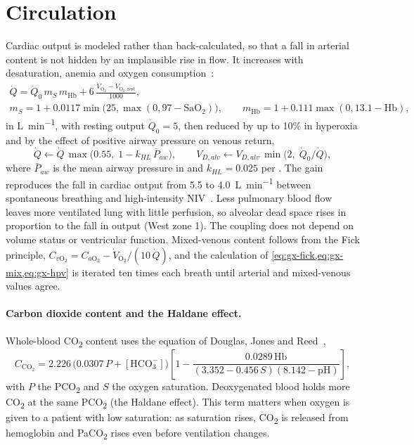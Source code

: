 \section{Circulation}
\label{sec:gx-circ}
Cardiac output is modeled rather than back-calculated, so that a fall in arterial content is not hidden by an implausible rise in flow. It increases with desaturation, anemia and oxygen consumption~\citep{west2012}:
\begin{equation}
\begin{gathered}
\dot Q = \dot Q_0\,m_S\,m_{\mathrm{Hb}} + 6\,\frac{\dot V_{\mathrm{O_2}} - \dot V_{\mathrm{O_2},\mathrm{rest}}}{1000},\\
m_S = 1 + 0.0117\min\bigl(25,\max(0,97 - \mathrm{SaO_2})\bigr),\qquad
m_{\mathrm{Hb}} = 1 + 0.111\max(0,13.1 - \mathrm{Hb}),
\end{gathered}
\label{eq:gx-q}
\end{equation}
in \si{\liter\per\minute}, with resting output $\dot Q_0 = 5$, then reduced by up to 10\% in hyperoxia and by the effect of positive airway pressure on venous return,
\begin{equation}
\dot Q\leftarrow\dot Q\,\max\bigl(0.55,\;1-k_{HL}\,\bar P_{aw}\bigr),\qquad
V_{D,alv}\leftarrow V_{D,alv}\,\min\bigl(2,\;\dot Q_0/\dot Q\bigr),
\label{eq:gx-hl}
\end{equation}
where $\bar P_{aw}$ is the mean airway pressure in \si{\cmH} and $k_{HL}=0.025$ per \si{\cmH}. The gain reproduces the fall in cardiac output from 5.5 to \SI{4.0}{\liter\per\minute} between spontaneous breathing and high-intensity NIV~\citep{lukacsovits2012}. Less pulmonary blood flow leaves more ventilated lung with little perfusion, so alveolar dead space rises in proportion to the fall in output (West zone 1). The coupling does not depend on volume status or ventricular function. Mixed-venous content follows from the Fick principle, $C_{v\mathrm{O_2}} = C_{a\mathrm{O_2}} - \dot V_{\mathrm{O_2}}/(10\,\dot Q)$, and the calculation of \cref{eq:gx-fick,eq:gx-mix,eq:gx-hpv} is iterated ten times each breath until arterial and mixed-venous values agree.

\paragraph{Carbon dioxide content and the Haldane effect.} Whole-blood CO\textsubscript{2} content uses the equation of Douglas, Jones and Reed~\citep{douglas1988},
\begin{equation}
C_{\mathrm{CO_2}} = 2.226\,\bigl(0.0307\,P + [\mathrm{HCO_3^-}]\bigr)\left[1 - \frac{0.0289\,\mathrm{Hb}}{(3.352 - 0.456\,S)(8.142 - \mathrm{pH})}\right],
\label{eq:gx-haldane}
\end{equation}
with $P$ the PCO\textsubscript{2} and $S$ the oxygen saturation. Deoxygenated blood holds more CO\textsubscript{2} at the same PCO\textsubscript{2} (the Haldane effect). This term matters when oxygen is given to a patient with low saturation: as saturation rises, CO\textsubscript{2} is released from hemoglobin and PaCO\textsubscript{2} rises even before ventilation changes.

